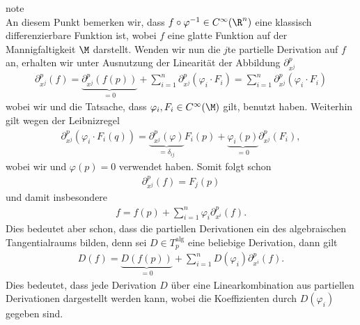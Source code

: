 \documentclass[letterpaper,10pt,german]{jupyterBook}
\begin{document}
\begin{sphinxadmonition}{note}
\begin{equation*}
\end{equation*}
\sphinxAtStartPar
An diesem Punkt bemerken wir, dass \(f\circ \varphi^{-1} \in C^\infty(\R^n)\) eine klassisch differenzierbare Funktion ist, wobei \(f\) eine glatte Funktion auf der Mannigfaltigkeit \(\M\) darstellt.
Wenden wir nun die \(j\)\sphinxhyphen{}te partielle Derivation auf \(f\) an, erhalten wir unter Ausnutzung der Linearität der Abbildung \(\partial_{x^j}^p\)
\begin{equation*}
\begin{split}\partial_{x^j}^p (f) = 
\underbrace{\partial_{x^j}^p (f(p))}_{=0} + 
\sum_{i=1}^{n} \partial_{x^j}^p(\varphi_i \cdot F_i) = 
\sum_{i=1}^{n} \partial_{x^j}^p(\varphi_i \cdot F_i)\end{split}
\end{equation*}
\sphinxAtStartPar
wobei wir {\hyperref[\detokenize{manifolds/tangential:lem:constder}]{}} und die Tatsache, dass \(\varphi_i, F_i\in C^\infty(\M)\) gilt, benutzt haben.
Weiterhin gilt wegen der Leibnizregel
\begin{equation*}
\begin{split}\partial_{x^j}^p(\varphi_i \cdot F_i(q)) = 
\underbrace{\partial_{x^j}^p(\varphi)}_{=\delta_{ij}} F_i(p)+ \underbrace{\varphi_i(p)}_{=0} \partial_{x^j}^p(F_i),\end{split}
\end{equation*}
\sphinxAtStartPar
wobei wir {\hyperref[\detokenize{manifolds/tangential:lem:partderkron}]{}} und \(\varphi(p)=0\) verwendet haben.
Somit folgt schon
\begin{equation*}
\begin{split}\partial_{x^j}^p (f) = F_j(p)\end{split}
\end{equation*}
\sphinxAtStartPar
und damit insbesondere
\begin{equation*}
\begin{split}f = f(p) + \sum_{i=1}^{n} \varphi_i \partial_{x^i}^p(f).\end{split}
\end{equation*}
\sphinxAtStartPar
Dies bedeutet aber schon, dass die partiellen Derivationen ein  des algebraischen Tangentialraums bilden, denn sei \(D\in T^{\text{alg}}_p\) eine beliebige Derivation, dann gilt
\begin{equation*}
\begin{split}D(f) = \underbrace{D(f(p))}_{=0} + \sum_{i=1}^n D(\varphi_i) \partial_{x^i}^p(f).\end{split}
\end{equation*}
\sphinxAtStartPar
Dies bedeutet, dass jede Derivation \(D\) über eine Linearkombination aus partiellen Derivationen dargestellt werden kann, wobei die Koeffizienten durch \(D(\varphi_i)\) gegeben sind.


\end{sphinxadmonition}
\end{document}
